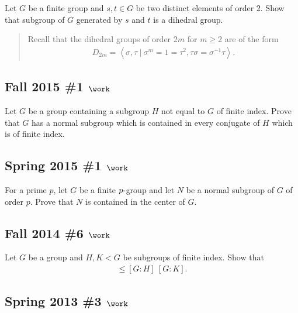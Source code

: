 Let \(G\) be a finite group and \(s, t\in G\) be two distinct elements
of order 2. Show that subgroup of \(G\) generated by \(s\) and \(t\) is
a dihedral group.

\begin{quote}
Recall that the dihedral groups of order \(2m\) for \(m\geq 2\) are of
the form
\begin{align*}
D_{2m} = \left\langle{\sigma, \tau {~\mathrel{\Big|}~}\sigma^m = 1 = \tau^2, \tau \sigma = \sigma^{-1}\tau}\right\rangle
.\end{align*}
\end{quote}

\hypertarget{fall-2015-1-work}{%
\subsection{\texorpdfstring{Fall 2015 \#1
\(\work\)}{Fall 2015 \#1 \textbackslash work}}\label{fall-2015-1-work}}

Let \(G\) be a group containing a subgroup \(H\) not equal to \(G\) of
finite index. Prove that \(G\) has a normal subgroup which is contained
in every conjugate of \(H\) which is of finite index.

\hypertarget{spring-2015-1-work}{%
\subsection{\texorpdfstring{Spring 2015 \#1
\(\work\)}{Spring 2015 \#1 \textbackslash work}}\label{spring-2015-1-work}}

For a prime \(p\), let \(G\) be a finite \(p{\hbox{-}}\)group and let
\(N\) be a normal subgroup of \(G\) of order \(p\). Prove that \(N\) is
contained in the center of \(G\).

\hypertarget{fall-2014-6-work}{%
\subsection{\texorpdfstring{Fall 2014 \#6
\(\work\)}{Fall 2014 \#6 \textbackslash work}}\label{fall-2014-6-work}}

Let \(G\) be a group and \(H, K < G\) be subgroups of finite index. Show
that
\begin{align*}
[G: H\cap K] \leq [G: H] ~ [G:K]
.\end{align*}

\hypertarget{spring-2013-3-work}{%
\subsection{\texorpdfstring{Spring 2013 \#3
\(\work\)}{Spring 2013 \#3 \textbackslash work}}\label{spring-2013-3-work}}

